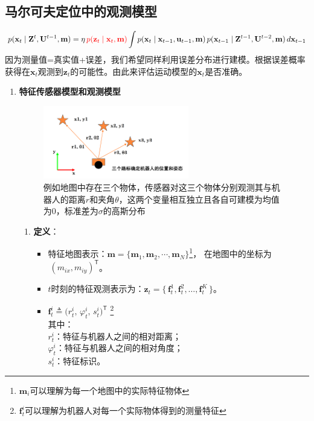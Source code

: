 \documentclass[../main.tex]{subfiles}
\begin{document}
\subsection{马尔可夫定位中的观测模型}
        \[
        p(\mathbf{x}_t \mid \mathbf{Z}^{t}, \mathbf{U}^{t-1}, \mathbf{m})
        = \eta \,\textcolor{red}{ p(\mathbf{z}_t \mid \mathbf{x}_t, \mathbf{m})}
        \int p(\mathbf{x}_t \mid \mathbf{x}_{t-1}, \mathbf{u}_{t-1}, \mathbf{m})
        \, p(\mathbf{x}_{t-1} \mid \mathbf{Z}^{t-1}, \mathbf{U}^{t-2}, \mathbf{m})
        \, d\mathbf{x}_{t-1}
        \]
        因为测量值=真实值+误差，我们希望同样利用误差分布进行建模。根据误差概率获得在$\mathbf{x}_t$观测到$\mathbf{z}_t$的可能性。由此来评估运动模型的$\mathbf{x}_t$是否准确。
    \begin{enumerate}
        \item \textbf{特征传感器模型和观测模型}
                    \begin{figure}[H]
                        \centering
                        \includegraphics[width=0.6\textwidth]{images/3lubiao.png}
                        \caption{例如地图中存在三个物体，传感器对这三个物体分别观测其与机器人的距离$r$和夹角$\theta$，这两个变量相互独立且各自可建模为均值为0，标准差为$\sigma$的高斯分布}
                    \end{figure}
        
        \begin{enumerate}
            \item \textbf{定义}：
            \begin{itemize}
                \item 特征地图表示：$\mathbf{m}=\{\mathbf{m}_1,\mathbf{m}_2,\cdots,\mathbf{m}_N\}$\footnote{$\mathbf{m}_i$可以理解为每一个地图中的实际特征物体}， 在地图中的坐标为$\ (m_{ix},m_{iy})^{\mathsf T}$。
                \item $t$时刻的特征观测表示为：$\mathbf{z}_t=\{\,\mathbf{f}_t^{1},\mathbf{f}_t^{2},\ldots,\mathbf{f}_t^{K}\,\}$。
                \item $\mathbf{f}_t^{i}\triangleq\big(r_t^{i},\,\varphi_t^{i},\,s_t^{i}\big)^{\mathsf T}$
                \footnote{$\mathbf{f}_t^{i}$可以理解为机器人对每一个实际物体得到的测量特征}\\其中：
                \\$r_t^{i}$：特征与机器人之间的相对距离；
                \\$\varphi_t^{i}$：特征与机器人之间的相对角度；
                \\$s_t^{i}$：特征标识。
            \end{itemize}
        

\end{enumerate}
\end{enumerate}
\end{document}
